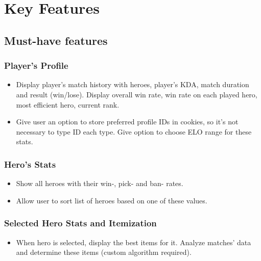 \section{Key Features}

\subsection{Must-have features}

\subsubsection{Player's Profile}

\begin{itemize}

    \item Display player's match history with heroes, player's KDA, match duration and result (win/lose).
    Display overall win rate, win rate on each played hero, most efficient hero, current rank.
    \item Give user an option to store preferred profile IDs in cookies, so it's not necessary to type ID each type.
    Give option to choose ELO range for these stats.

\end{itemize}

\subsubsection{Hero's Stats}

\begin{itemize}

    \item Show all heroes with their win-, pick- and ban- rates.
    \item Allow user to sort list of heroes based on one of these values.

\end{itemize}

\subsubsection{Selected Hero Stats and Itemization}

\begin{itemize}

    \item When hero is selected, display the best items for it.
    Analyze matches' data and determine these items (custom algorithm required).

\end{itemize}


